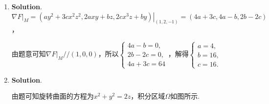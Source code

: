 \documentclass[../Main.tex]{subfiles}
\begin{document}
\begin{enumerate}
          所以由夹逼定理可知$\lim_{\substack{x\to 0 \\ y\to 0}}\frac{x^{2}y^{2}}{\left(x^{2}+y^{2}\right)^{\frac{3}{2}}}
              =0=f(0,0)$，函数$f(x,y)$在原点处连续.

          又$f(x,0)=f(0,y)\equiv 0$，所以$f_{x}(0,0)=f_{y}(0,0)=0$，因此函数$f(x,y)$在原点处的偏导数存在.

          考察$\lim_{\substack{x\to 0 \\ y\to 0}}\frac{f(x,y)-f(0,0)-f_{x}(0,0)x-f_{y}(0,0)y}{\sqrt{x^{2}+y^{2}}}
              = \lim_{\substack{x\to 0 \\ y\to 0}}\frac{x^{2} y^{2}}{\left(x^{2}+y^{2}\right)^{2}}$.

          当$y=x,x\to0,y\to0$时，$\lim_{\substack{x\to 0 \\ y\to 0}}\frac{x^{2} y^{2}}{\left(x^{2}+y^{2}\right)^{2}}
              = \lim_{x\to0}\frac{x^{4}}{(2x^{2})^{2}}= \frac{1}{4}$，所以$\lim_{\substack{x\to 0 \\ y\to 0}}
              \frac{x^{2} y^{2}}{\left(x^{2}+y^{2}\right)^{2}}\neq 0$，

          因此函数$f(x,y)$在原点处不可微.

    \item \textbf{Solution}. $\nabla F |_{M}= \left.\left(ay^{2}+3cx^{2} z^{2}
              , 2axy+bz, 2cx^{3} z + by\right)\right|_{(1,2,-1)}=(4a+3c, 4a-b, 2b-2c)$，

          由题意可知$\nabla F |_{M}// (1,0,0)$，所以$\begin{cases}
                  4a-b = 0,  \\
                  2b-2c = 0, \\
                  4a+3c = 64
              \end{cases}$，解得$\begin{cases}
                  a = 4,  \\
                  b = 16, \\
                  c = 16.
              \end{cases}$

    \item \textbf{Solution}.

          \noindent
          \begin{minipage}[c]{0.6\textwidth}
              由题可知旋转曲面的方程为$x^{2}+y^{2}=2z$，积分区域$\Omega$如图所示.


\end{minipage}
\end{enumerate}
\end{document}

